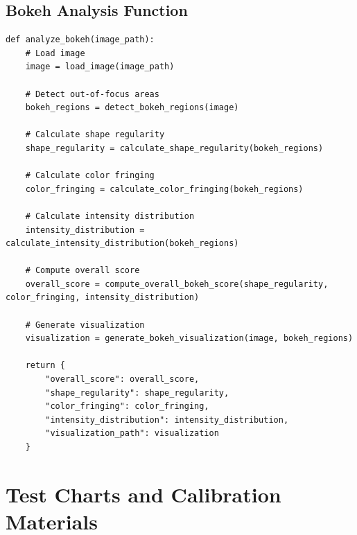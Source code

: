 \section{Bokeh Analysis Function}
\label{lst:bokeh_code}

\begin{verbatim}
def analyze_bokeh(image_path):
    # Load image
    image = load_image(image_path)
    
    # Detect out-of-focus areas
    bokeh_regions = detect_bokeh_regions(image)
    
    # Calculate shape regularity
    shape_regularity = calculate_shape_regularity(bokeh_regions)
    
    # Calculate color fringing
    color_fringing = calculate_color_fringing(bokeh_regions)
    
    # Calculate intensity distribution
    intensity_distribution = calculate_intensity_distribution(bokeh_regions)
    
    # Compute overall score
    overall_score = compute_overall_bokeh_score(shape_regularity, color_fringing, intensity_distribution)
    
    # Generate visualization
    visualization = generate_bokeh_visualization(image, bokeh_regions)
    
    return {
        "overall_score": overall_score,
        "shape_regularity": shape_regularity,
        "color_fringing": color_fringing,
        "intensity_distribution": intensity_distribution,
        "visualization_path": visualization
    }
\end{verbatim}




\chapter{Test Charts and Calibration Materials}
\label{app:test_charts}


